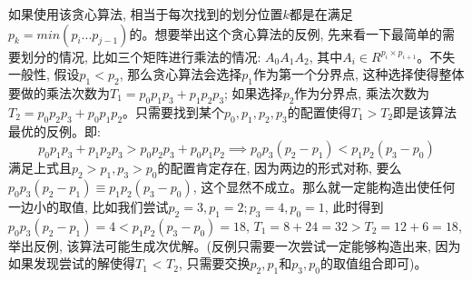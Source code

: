 \documentclass[paper=a4, fontsize=11pt]{scrartcl} %
\numberwithin{equation}{section} %
\numberwithin{figure}{section} %
\numberwithin{table}{section} %
\begin{document}
如果使用该贪心算法, 相当于每次找到的划分位置$k$都是在满足$p_k = min(p_i ... p_{j-1})$的。想要举出这个贪心算法的反例, 先来看一下最简单的需要划分的情况, 比如三个矩阵进行乘法的情况: $A_0A_1A_2$, 其中$A_i \in R^{p_i \times p_{i+1}}$。不失一般性, 假设$p_1 < p_2$, 那么贪心算法会选择$p_1$作为第一个分界点, 这种选择使得整体要做的乘法次数为$T_1 = p_0p_1p_3 + p_1p_2p_3$; 如果选择$p_2$作为分界点, 乘法次数为$T_2 = p_0p_2p_3 + p_0p_1p_2$。只需要找到某个$p_0, p_1, p_2, p_3$的配置使得$T_1 > T_2$即是该算法最优的反例。即:
\[
p_0p_1p_3 + p_1p_2p_3 > p_0p_2p_3 + p_0p_1p_2 \implies p_0p_3(p_2-p_1) < p_1p_2(p_3-p_0)
\]
满足上式且$p_2 > p_1, p_3 > p_0$的配置肯定存在, 因为两边的形式对称, 要么$p_0p_3(p_2 - p_1) \equiv p_1p_2(p_3-p_0)$, 这个显然不成立。那么就一定能构造出使任何一边小的取值, 比如我们尝试$p_2 = 3, p_1 = 2; p_3 = 4, p_0 = 1$, 此时得到$p_0p_3(p_2-p_1) = 4 < p_1p_2(p_3-p_0)=18$, $T_1 = 8 + 24 = 32 > T_2 = 12 + 6 = 18$, 举出反例, 该算法可能生成次优解。(反例只需要一次尝试一定能够构造出来, 因为如果发现尝试的解使得$T_1$ < $T_2$, 只需要交换$p_2, p_1$和$p_3, p_0$的取值组合即可)。
\end{document}
